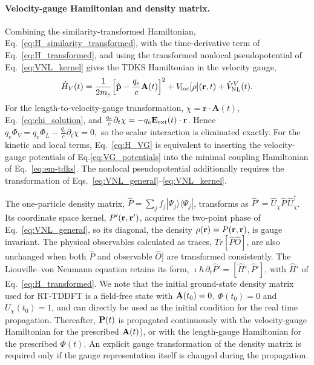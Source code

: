 \paragraph{Velocity-gauge Hamiltonian and density matrix.}
Combining the similarity-transformed Hamiltonian, Eq.~\eqref{eq:H_similarity_transformed},
 with the time-derivative term of Eq.~\eqref{eq:H_transformed},  and using the 
 transformed nonlocal pseudopotential of Eq.~\eqref{eq:VNL_kernel}
gives the TDKS Hamiltonian in the velocity gauge,
\begin{equation}
  \hat H_V(t) = \frac{1}{2m_e}\Big[\vb{\hat p} - \frac{q_e}{c}\vb A(t)\Big]^2
              + V_{\mathrm{loc}}[\rho](\vb r,t) + \hat V^{V}_{\mathrm{NL}}(t) .
  \label{eq:H_VG}
\end{equation}
For  the length-to-velocity-gauge transformation, $\chi=\mathbf r\cdot\mathbf A(t)$,  
Eq.~\eqref{eq:chi_solution}, and 
 $ \frac{q_e}{c}\partial_t\chi= - q_e\mathbf E_{\rm ext}(t)\cdot\mathbf r$.
 Hence 
$q_e \Phi_V =  q_e\Phi_L -   \frac{q_e}{c}\partial_t\chi=0,$
so the scalar interaction is eliminated exactly.
For the kinetic and local terms, Eq.~\eqref{eq:H_VG} is equivalent to inserting the velocity-gauge potentials of
  Eq.\eqref{eq:VG_potentials} into  the minimal coupling Hamiltonian of Eq.~\eqref{eq:em-tdks}.
The nonlocal pseudopotential additionally requires the transformation of Eqs.~\eqref{eq:VNL_general}--\eqref{eq:VNL_kernel}.


 The one-particle density matrix,
$\hat P = \sum_j f_j|\Psi_j\rangle\langle\Psi_j|$, transforms as
$\hat P' = \hat U_\chi\hat P\,\hat U_\chi^\dagger$. Its coordinate space  kernel, $P'(\vb r, \vb r')$,
acquires the two-point phase of Eq.~\eqref{eq:VNL_general}, so  its diagonal, the
density $\rho(\vb r) = P(\vb r,\vb r)$, is gauge invariant. 
The physical observables calculated as traces, $Tr[\hat P \hat O]$, are also unchanged   
when both $\hat P$ and observable $\hat O]$ are transformed  consistently.
The Liouville--von Neumann equation retains its form,
$\imath\hbar\,\partial_t\hat P' = [\hat H',\hat P']$, with $\hat H'$ of
Eq.~\eqref{eq:H_transformed}. 
We note that the initial ground-state density matrix used for RT-TDDFT is a field-free state
with $\vb A(t_0)=0$, $\Phi(t_0)=0$  and $U_\chi(t_0)=1$, and can directly be used as the initial condition 
for the real time propagation. 
Thereafter, $\vb P(t)$ is propagated continuously with the velocity-gauge Hamiltonian 
for the prescribed  $\vb A(t)$), or with the length-gauge Hamiltonian for the prescribed $\Phi(t)$. 
An explicit gauge transformation of the density matrix is required only if the gauge representation
itself is changed during the propagation.


